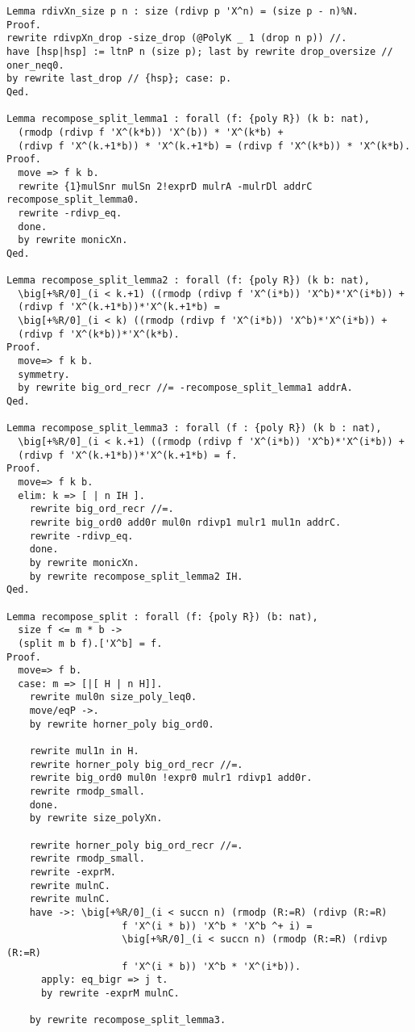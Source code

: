 \begin{lstlisting}
Lemma rdivXn_size p n : size (rdivp p 'X^n) = (size p - n)%N.
Proof.
rewrite rdivpXn_drop -size_drop (@PolyK _ 1 (drop n p)) //.
have [hsp|hsp] := ltnP n (size p); last by rewrite drop_oversize // oner_neq0.
by rewrite last_drop // {hsp}; case: p.
Qed.

Lemma recompose_split_lemma1 : forall (f: {poly R}) (k b: nat),
  (rmodp (rdivp f 'X^(k*b)) 'X^(b)) * 'X^(k*b) +
  (rdivp f 'X^(k.+1*b)) * 'X^(k.+1*b) = (rdivp f 'X^(k*b)) * 'X^(k*b).
Proof.
  move => f k b.
  rewrite {1}mulSnr mulSn 2!exprD mulrA -mulrDl addrC recompose_split_lemma0.
  rewrite -rdivp_eq.
  done.
  by rewrite monicXn.
Qed.

Lemma recompose_split_lemma2 : forall (f: {poly R}) (k b: nat),
  \big[+%R/0]_(i < k.+1) ((rmodp (rdivp f 'X^(i*b)) 'X^b)*'X^(i*b)) +
  (rdivp f 'X^(k.+1*b))*'X^(k.+1*b) =
  \big[+%R/0]_(i < k) ((rmodp (rdivp f 'X^(i*b)) 'X^b)*'X^(i*b)) +
  (rdivp f 'X^(k*b))*'X^(k*b).
Proof.
  move=> f k b.
  symmetry.
  by rewrite big_ord_recr //= -recompose_split_lemma1 addrA.
Qed.

Lemma recompose_split_lemma3 : forall (f : {poly R}) (k b : nat),
  \big[+%R/0]_(i < k.+1) ((rmodp (rdivp f 'X^(i*b)) 'X^b)*'X^(i*b)) +
  (rdivp f 'X^(k.+1*b))*'X^(k.+1*b) = f.
Proof.
  move=> f k b.
  elim: k => [ | n IH ].
    rewrite big_ord_recr //=.
    rewrite big_ord0 add0r mul0n rdivp1 mulr1 mul1n addrC.
    rewrite -rdivp_eq.
    done.
    by rewrite monicXn.
    by rewrite recompose_split_lemma2 IH.
Qed.

Lemma recompose_split : forall (f: {poly R}) (b: nat),
  size f <= m * b ->
  (split m b f).['X^b] = f.
Proof.
  move=> f b.
  case: m => [|[ H | n H]].
    rewrite mul0n size_poly_leq0.
    move/eqP ->.
    by rewrite horner_poly big_ord0.

    rewrite mul1n in H.
    rewrite horner_poly big_ord_recr //=.
    rewrite big_ord0 mul0n !expr0 mulr1 rdivp1 add0r.
    rewrite rmodp_small.
    done.
    by rewrite size_polyXn.

    rewrite horner_poly big_ord_recr //=.
    rewrite rmodp_small.
    rewrite -exprM.
    rewrite mulnC.
    rewrite mulnC.
    have ->: \big[+%R/0]_(i < succn n) (rmodp (R:=R) (rdivp (R:=R)
                    f 'X^(i * b)) 'X^b * 'X^b ^+ i) =
                    \big[+%R/0]_(i < succn n) (rmodp (R:=R) (rdivp (R:=R)
                    f 'X^(i * b)) 'X^b * 'X^(i*b)).
      apply: eq_bigr => j t.
      by rewrite -exprM mulnC.

    by rewrite recompose_split_lemma3.


\end{lstlisting}
